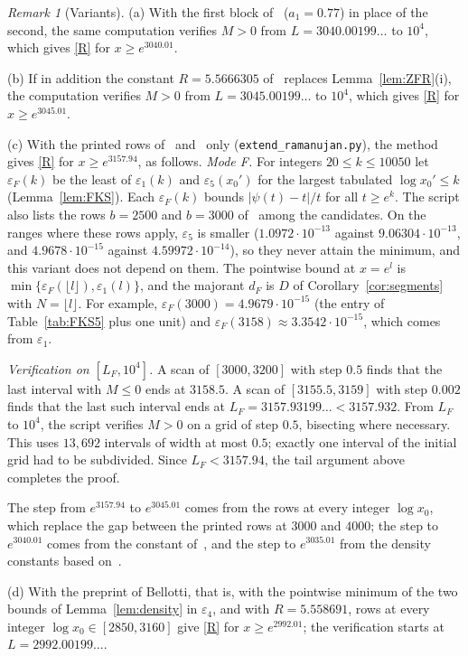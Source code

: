 \documentclass{amsart}
\theoremstyle{definition}
\theoremstyle{remark}
\newtheorem{remark}[theorem]{Remark}
\theoremstyle{plain}
\numberwithin{equation}{section}
\newcommand{\eps}{\varepsilon}
\begin{document}
\begin{remark}[Variants]\label{rem:Cvar}
(a) With the first block of~\cite[Table~7]{FKS23} ($a_1=0.77$) in place of the second, the same computation verifies $M>0$ from $L=3040.00199\ldots$ to $10^4$, which gives \eqref{R} for $x\ge e^{3040.01}$.

(b) If in addition the constant $R=5.5666305$ of~\cite{FKS23} replaces Lemma~\ref{lem:ZFR}(i), the computation verifies $M>0$ from $L=3045.00199\ldots$ to $10^4$, which gives \eqref{R} for $x\ge e^{3045.01}$.

(c) With the printed rows of~\cite[Table~5]{FKS23} and~\cite[Cor.~1.4]{FKS23} only (\texttt{extend\_ramanujan.py}), the method gives \eqref{R} for $x\ge e^{3157.94}$, as follows. \emph{Mode F.} For integers $20\le k\le10050$ let $\eps_F(k)$ be the least of $\eps_1(k)$ and $\eps_5(x_0')$ for the largest tabulated $\log x_0'\le k$ (Lemma~\ref{lem:FKS}). Each $\eps_F(k)$ bounds $|\psi(t)-t|/t$ for all $t\ge e^k$. The script also lists the rows $b=2500$ and $b=3000$ of~\cite[Table~8]{BKLNW21} among the candidates. On the ranges where these rows apply, $\eps_5$ is smaller ($1.0972\cdot10^{-13}$ against $9.06304\cdot10^{-13}$, and $4.9678\cdot10^{-15}$ against $4.59972\cdot10^{-14}$), so they never attain the minimum, and this variant does not depend on them. The pointwise bound at $x=e^l$ is $\min\{\eps_F(\lfloor l\rfloor),\eps_1(l)\}$, and the majorant $d_F$ is $D$ of Corollary~\ref{cor:segments} with $N=\lfloor l\rfloor$. For example, $\eps_F(3000)=4.9679\cdot10^{-15}$ (the entry of Table~\ref{tab:FKS5} plus one unit) and $\eps_F(3158)\approx3.3542\cdot10^{-15}$, which comes from $\eps_1$.

\emph{Verification on $[L_F,10^4]$.} A scan of $[3000,3200]$ with step $0.5$ finds that the last interval with $M\le0$ ends at $3158.5$. A scan of $[3155.5,3159]$ with step $0.002$ finds that the last such interval ends at $L_F=3157.93199\ldots<3157.932$. From $L_F$ to $10^4$, the script verifies $M>0$ on a grid of step $0.5$, bisecting where necessary. This uses $13{,}692$ intervals of width at most $0.5$; exactly one interval of the initial grid had to be subdivided. Since $L_F<3157.94$, the tail argument above completes the proof.

The step from $e^{3157.94}$ to $e^{3045.01}$ comes from the rows at every integer $\log x_0$, which replace the gap between the printed rows at $3000$ and $4000$; the step to $e^{3040.01}$ comes from the constant of~\cite{MTY23}, and the step to $e^{3035.01}$ from the density constants based on~\cite{HPY24}.

(d) With the preprint of Bellotti, that is, with the pointwise minimum of the two bounds of Lemma~\ref{lem:density} in $\eps_4$, and with $R=5.558691$, rows at every integer $\log x_0\in[2850,3160]$ give \eqref{R} for $x\ge e^{2992.01}$; the verification starts at $L=2992.00199\ldots$.
\end{remark}
\end{document}
